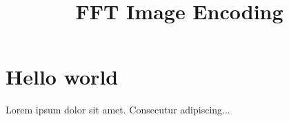 \documentclass[sigplan]{acmart}
\title{FFT Image Encoding}
\begin{document}
  \maketitle

  \section{Hello world}

  Lorem ipsum dolor sit amet. Consecutur adipiscing...
\end{document}
